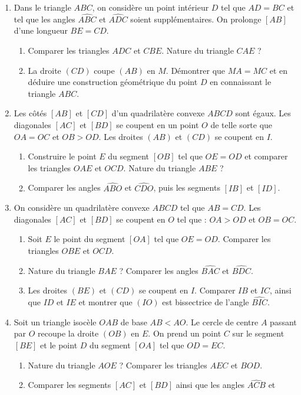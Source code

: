 \documentclass[12 pt]{report}
\theoremstyle{plain}
\newcounter{n}
\begin{document}
\begin{enumerate}
\item Dans le triangle $ABC$, on considère un point intérieur $D$ tel que $AD=BC$ et tel que les angles $\widehat{ABC}$ et $\widehat{ADC}$ soient supplémentaires. On
prolonge $[AB]$ d'une longueur $BE=CD$.\begin{enumerate}
\item Comparer les triangles $ADC$ et $CBE$. Nature du triangle $CAE$ ? 
\item La droite $(CD)$ coupe $(AB)$ en $M$. Démontrer que $MA=MC$ et en déduire une construction géométrique du point $D$ en connaissant le triangle $ABC$. 
\end{enumerate}
\item Les côtés $[AB]$ et $[CD]$ d'un quadrilatère convexe $ABCD$ sont égaux. Les diagonales $[AC]$ et $[BD]$ se coupent en un point $O$ de telle sorte que $OA=OC$ et 
$OB>OD$. Les droites $(AB)$ et $(CD)$ se coupent en $I$. \begin{enumerate}
\item Construire le point $E$ du segment $[OB]$ tel que $OE=OD$ et comparer les triangles $OAE$ et $OCD$. Nature du triangle $ABE$ ? 
\item Comparer les angles $\widehat{ABO}$ et $\widehat{CDO}$, puis les segments $[IB]$ et $[ID]$.
\end{enumerate}
\item On considère un quadrilatère convexe $ABCD$ tel que $AB=CD$. Les diagonales 
$[AC]$ et $[BD]$ se coupent en $O$ tel que : $OA>OD$ et $OB=OC$. \begin{enumerate}
\item Soit $E$ le point du segment $[OA]$ tel que $OE=OD$. Comparer les triangles
$OBE$ et $OCD$.
\item Nature du triangle $BAE$ ? Comparer les angles $\widehat{BAC}$ et $\widehat{BDC}$.
\item Les droites $(BE)$ et $(CD)$ se coupent en $I$. Comparer $IB$ et $IC$, ainsi que $ID$ et $IE$ et montrer que $(IO)$ est bissectrice de l'angle $\widehat{BIC}$.
\end{enumerate}
\item Soit un triangle isocèle $OAB$ de base $AB<AO$. Le cercle de centre $A$ passant par $O$ recoupe la droite $(OB)$ en $E$. On prend un point $C$ sur le segment $[BE]$
et le point $D$ du segment $[OA]$ tel que $OD=EC$. \begin{enumerate}
\item Nature du triangle $AOE$ ? Comparer les triangles $AEC$ et $BOD$. 
\item Comparer les segments $[AC]$ et $[BD]$ ainsi que les angles $\widehat{ACB}$ et

\end{enumerate}
\end{enumerate}
\end{document}
